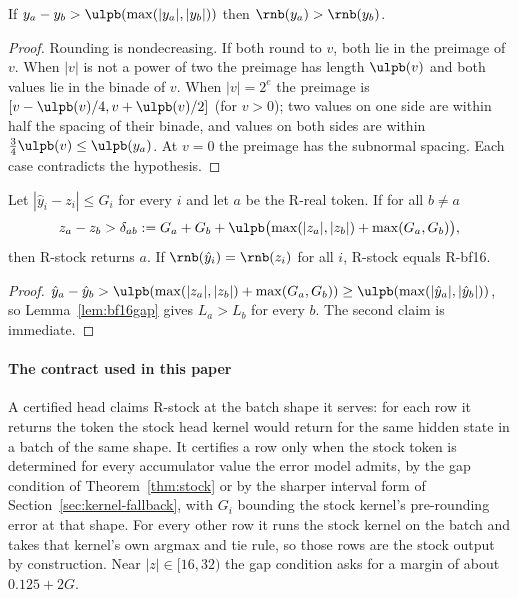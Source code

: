 \begin{lemma}[BF16 separation]\label{lem:bf16gap}
If $y_a-y_b>\ulpb(\max(|y_a|,|y_b|))$ then $\rnb(y_a)>\rnb(y_b)$.
\end{lemma}
\begin{proof}
Rounding is nondecreasing. If both round to $v$, both lie in the preimage of $v$. When $|v|$ is not a power of two the preimage has length $\ulpb(v)$ and both values lie in the binade of $v$. When $|v|=2^e$ the preimage is $[v-\ulpb(v)/4,v+\ulpb(v)/2]$ (for $v>0$); two values on one side are within half the spacing of their binade, and values on both sides are within $\tfrac34\ulpb(v)\le\ulpb(y_a)$. At $v=0$ the preimage has the subnormal spacing. Each case contradicts the hypothesis.
\end{proof}

\begin{theorem}\label{thm:stock}
Let $|\hat y_i-z_i|\le G_i$ for every $i$ and let $a$ be the R-real token. If for all $b\ne a$
\[z_a-z_b>\delta_{ab}:=G_a+G_b+\ulpb\bigl(\max(|z_a|,|z_b|)+\max(G_a,G_b)\bigr),\]
then R-stock returns $a$. If $\rnb(\hat y_i)=\rnb(z_i)$ for all $i$, R-stock equals R-bf16.
\end{theorem}
\begin{proof}
$\hat y_a-\hat y_b>\ulpb(\max(|z_a|,|z_b|)+\max(G_a,G_b))\ge\ulpb(\max(|\hat y_a|,|\hat y_b|))$, so Lemma~\ref{lem:bf16gap} gives $L_a>L_b$ for every $b$. The second claim is immediate.
\end{proof}

\paragraph{The contract used in this paper} A certified head claims R-stock at the batch shape it serves: for each row it returns the token the stock head kernel would return for the same hidden state in a batch of the same shape. It certifies a row only when the stock token is determined for every accumulator value the error model admits, by the gap condition of Theorem~\ref{thm:stock} or by the sharper interval form of Section~\ref{sec:kernel-fallback}, with $G_i$ bounding the stock kernel's pre-rounding error at that shape. For every other row it runs the stock kernel on the batch and takes that kernel's own argmax and tie rule, so those rows are the stock output by construction. Near $|z|\in[16,32)$ the gap condition asks for a margin of about $0.125+2G$.

